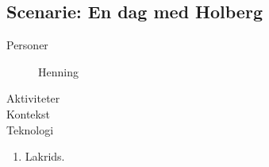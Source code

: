 \subsection{Scenarie: En dag med Holberg}

\begin{description}
    \item[Personer] Henning
    \item[Aktiviteter]
    \item[Kontekst]
    \item[Teknologi]
\end{description}

\begin{enumerate}
    \item Lakrids.
\end{enumerate}
